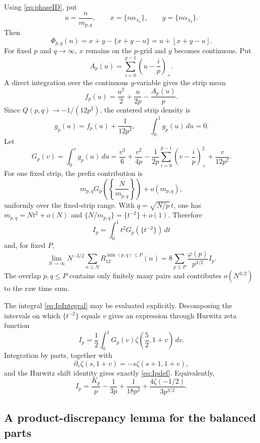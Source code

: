 \documentclass[a4paper,american,11pt]{amsart}
\theoremstyle{plain}
\theoremstyle{definition}
\newcommand{\dd}{\,d}
\newcommand{\floor}[1]{\left\lfloor #1\right\rfloor}
\begin{document}
Using \eqref{eq:phaseID}, put
\[
 u=\frac{n}{m_{p,q}},
 \qquad
 x=\{n\alpha_{\lambda_1}\},
 \qquad
 y=\{n\alpha_{\lambda_2}\}.
\]
Then
\[
 \Phi_{p,q}(n)=x+y-\{x+y-u\}=u+\floor{x+y-u}.
\]
For fixed \(p\) and \(q\to\infty\), \(x\) remains on the \(p\)-grid and
\(y\) becomes continuous.  Put
\[
 A_p(u)=\sum_{i=0}^{p-1}\left(u-\frac{i}{p}\right)_+.
\]
A direct integration over the continuous \(y\)-variable gives the strip mean
\begin{equation}\label{eq:fpstrip}
 f_p(u)=\frac{u^2}{2}+\frac{u}{2p}-\frac{A_p(u)}p.
\end{equation}
Since \(Q(p,q)\to -1/(12p^2)\), the centered strip density is
\[
 g_p(u)=f_p(u)+\frac{1}{12p^2},
 \qquad
 \int_0^1g_p(u)\dd u=0.
\]
Let
\begin{equation}\label{eq:Gpdef}
 G_p(v)=\int_0^v g_p(u)\dd u
 =\frac{v^3}{6}+\frac{v^2}{4p}
 -\frac{1}{2p}\sum_{i=0}^{p-1}\left(v-\frac{i}{p}\right)_+^2
 +\frac{v}{12p^2}.
\end{equation}
For one fixed strip, the prefix contribution is
\begin{equation}\label{eq:prefixPair}
 m_{p,q}G_p\left(\left\{\frac{N}{m_{p,q}}\right\}\right)+o(m_{p,q}),
\end{equation}
uniformly over the fixed-strip range.  With \(q=\sqrt{N/p}\,t\), one has
\(m_{p,q}=Nt^2+o(N)\) and \(\{N/m_{p,q}\}=\{t^{-2}\}+o(1)\).  Therefore
\begin{equation}\label{eq:IpIntegral}
 I_p=\int_0^1 t^2G_p(\{t^{-2}\})\dd t
\end{equation}
and, for fixed \(P\),
\begin{equation}\label{eq:FSH12}
 \lim_{N\to\infty}N^{-3/2}\sum_{n\le N}R_{12}^{\min(p,q)\le P}(n)
 =8\sum_{p\le P}\frac{\varphi(p)}{p^{3/2}}I_p.
\end{equation}
The overlap \(p,q\le P\) contains only finitely many pairs and contributes
\(o(N^{3/2})\) to the raw time sum.

The integral \eqref{eq:IpIntegral} may be evaluated explicitly.  Decomposing
the intervals on which \(\{t^{-2}\}\) equals \(v\) gives an expression through Hurwitz zeta function
\[
 I_p=\frac12\int_0^1G_p(v)\zeta\!\left(\frac52,1+v\right)\dd v.
\]
Integration by parts, together with
\[
 \partial_v\zeta(s,1+v)=-s\zeta(s+1,1+v),
\]
and the Hurwitz shift identity gives exactly \eqref{eq:Ipdef}.  Equivalently,
\[
 I_p=\frac{K_p}{p}-\frac{1}{3p}+\frac{1}{18p^2}+\frac{4\zeta(-1/2)}{3p^{3/2}}.
\]

\subsection{A product-discrepancy lemma for the balanced parts}
\end{document}
